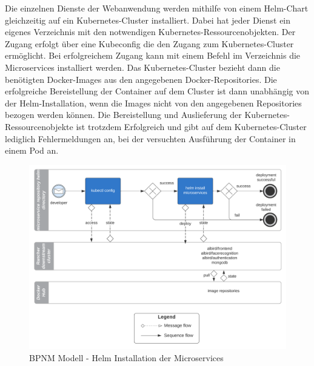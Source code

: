 Die einzelnen Dienste der Webanwendung werden mithilfe von einem Helm-Chart gleichzeitig auf ein Kubernetes-Cluster installiert.
Dabei hat jeder Dienst ein eigenes Verzeichnis mit den notwendigen Kubernetes-Ressourcenobjekten.
Der Zugang erfolgt über eine Kubeconfig die den Zugang zum Kubernetes-Cluster ermöglicht.
Bei erfolgreichem Zugang kann mit einem Befehl im Verzeichnis die Microservices installiert werden.
Das Kubernetes-Cluster bezieht dann die benötigten Docker-Images aus den angegebenen Docker-Repositories.
Die erfolgreiche Bereistellung der Container auf dem Cluster ist dann unabhängig von der Helm-Installation, wenn die Images nicht von den angegebenen Repositories bezogen werden können. 
Die Bereistellung und Auslieferung der Kubernetes-Ressourcenobjekte ist trotzdem Erfolgreich und gibt auf dem Kubernetes-Cluster lediglich Fehlermeldungen an, bei der versuchten Ausführung der Container in einem Pod an.

\begin{figure}[!htb]
    \centering
    \includegraphics[width=1.0\columnwidth]{images/BPMNHelm.png}
    \caption{BPNM Modell - Helm Installation der Microservices}
    \label{fig:HelmInstallation}
\end{figure}





